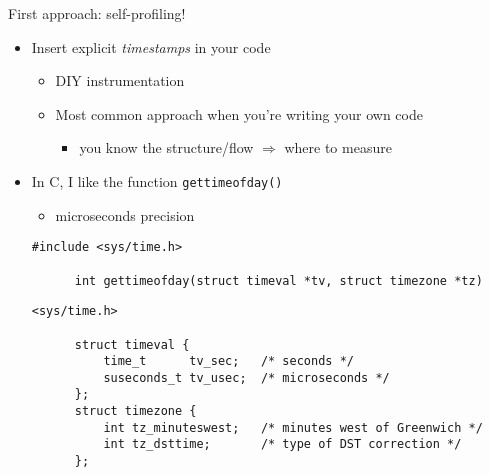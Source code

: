 \documentclass[10pt,xcolor=table]{beamer}
\begin{document}
\begin{frame}[fragile]{First approach: self-profiling!}

  \begin{itemize}
  \item Insert explicit \emph{timestamps} in your code
    \begin{itemize}
    \item DIY instrumentation
    \item Most common approach when you're writing your own code
      \begin{itemize}
      \item you know the structure/flow $\Rightarrow$ where to measure
      \end{itemize}
    \end{itemize}

    \pause

  \item In C, I like the function {\tt gettimeofday()}
    \begin{itemize}
    \item microseconds precision
    \end{itemize}

    \begin{lstlisting}[style=c,gobble=4]
      #include <sys/time.h>

      int gettimeofday(struct timeval *tv, struct timezone *tz)
   \end{lstlisting}

    \begin{lstlisting}[style=c,gobble=4]
      <sys/time.h>

      struct timeval {
          time_t      tv_sec;   /* seconds */
          suseconds_t tv_usec;  /* microseconds */
      };
      struct timezone {
          int tz_minuteswest;   /* minutes west of Greenwich */
          int tz_dsttime;       /* type of DST correction */
      };
   \end{lstlisting}
  \end{itemize}

\end{frame}
\end{document}
